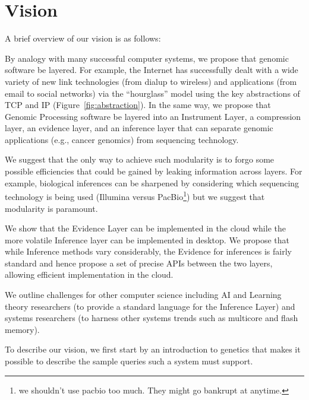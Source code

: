 \documentclass[10pt,fullpage]{article}
\newenvironment{packed_enum}{
\begin{enumerate}
  \setlength{\itemsep}{1pt}
  \setlength{\parskip}{0pt}
  \setlength{\parsep}{0pt}
}{\end{enumerate}}
\begin{document}
\section{Vision}
\label{sec:vision}
A brief overview of our vision is as follows:
\begin{packed_enum}
\item By analogy with many successful computer systems, we propose
  that genomic software be layered.  For example, the Internet has
  successfully dealt with a wide variety of new link technologies
  (from dialup to wireless) and applications (from email to social
  networks) via the ``hourglass'' model using the key abstractions of
  TCP and IP (Figure~\ref{fig:abstraction}).  In the same way, we propose that Genomic
  Processing software be layered into an Instrument Layer, a
  compression layer, an evidence layer, and an inference layer that
  can separate genomic applications (e.g., cancer genomics) from
  sequencing technology.

\item We suggest that the only way to achieve such modularity is to
  forgo some possible efficiencies that could be gained by leaking
  information across layers.  For example, biological inferences can
  be sharpened by considering which sequencing technology is being
  used (Illumina versus PacBio\footnote{we shouldn't use pacbio too
    much. They might go bankrupt at anytime.}) but we suggest that
  modularity is paramount.

\item We show that the Evidence Layer can be implemented in the cloud
  while the more volatile Inference layer can be implemented in
  desktop.  We propose that while Inference methods vary considerably,
  the Evidence for inferences is fairly standard and hence propose a
  set of precise APIs between the two layers, allowing efficient
  implementation in the cloud.

\item We outline challenges for other computer science including AI
  and Learning theory researchers (to provide a standard language for
  the Inference Layer) and systems researchers (to harness other
  systems trends such as multicore and flash memory).
\end{packed_enum}
To describe our vision, we first start by an introduction to genetics
that makes it possible to describe the sample queries such a system
must support.
\end{document}
